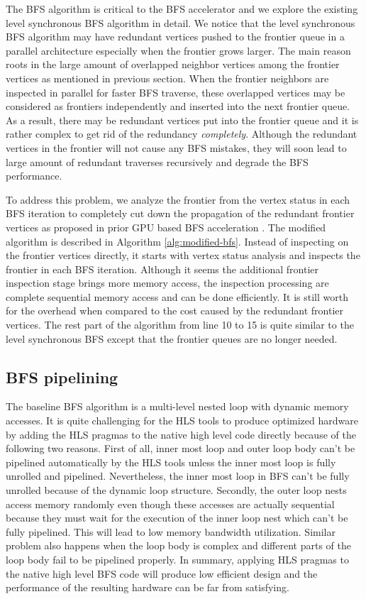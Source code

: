 The BFS algorithm is critical to the BFS accelerator and we explore the 
existing level synchronous BFS algorithm in detail. We notice that 
the level synchronous BFS algorithm may have redundant vertices pushed to the 
frontier queue in a parallel architecture especially when the frontier grows larger.
The main reason roots in the large amount of overlapped neighbor vertices among the 
frontier vertices as mentioned in previous section. When the frontier neighbors 
are inspected in parallel for faster BFS traverse, these overlapped vertices may be 
considered as frontiers independently and inserted into the next frontier queue. 
As a result, there may be redundant vertices put into the frontier queue and it is 
rather complex to get rid of the redundancy \textit{completely}. Although the redundant 
vertices in the frontier will not cause any BFS mistakes, they will soon lead to large 
amount of redundant traverses recursively and degrade the BFS performance.

To address this problem, we analyze the frontier from the 
vertex status in each BFS iteration to completely cut down the 
propagation of the redundant frontier vertices as proposed in prior 
GPU based BFS acceleration \cite{liu2015enterprise}. The modified algorithm is described 
in Algorithm \ref{alg:modified-bfs}. Instead of inspecting on the frontier vertices directly, 
it starts with vertex status analysis and inspects the frontier 
in each BFS iteration. Although it seems the additional frontier inspection stage 
brings more memory access, the inspection processing are complete sequential 
memory access and can be done efficiently. It is still worth for the overhead 
when compared to the cost caused by the redundant frontier vertices. 
The rest part of the algorithm from line 10 to 15 is 
quite similar to the level synchronous BFS except that the frontier queues 
are no longer needed.


\subsection{BFS pipelining}
The baseline BFS algorithm is a multi-level nested loop with 
dynamic memory accesses. It is quite challenging for the HLS 
tools to produce optimized hardware by adding the HLS pragmas to 
the native high level code directly because of the following two 
reasons. First of all, inner most loop and outer loop body can't be pipelined 
automatically by the HLS tools unless the inner most loop is fully 
unrolled and pipelined. Nevertheless, the inner most loop in BFS 
can't be fully unrolled because of the dynamic loop structure.  
Secondly, the outer loop nests access memory randomly even though 
these accesses are actually sequential because they must wait 
for the execution of the inner loop nest which can't 
be fully pipelined. This will lead to low 
memory bandwidth utilization. Similar problem also happens when the 
loop body is complex and different parts of the loop body fail to be 
pipelined properly. In summary, applying HLS pragmas to the native high level BFS code 
will produce low efficient design and the performance of the resulting hardware 
can be far from satisfying.  

